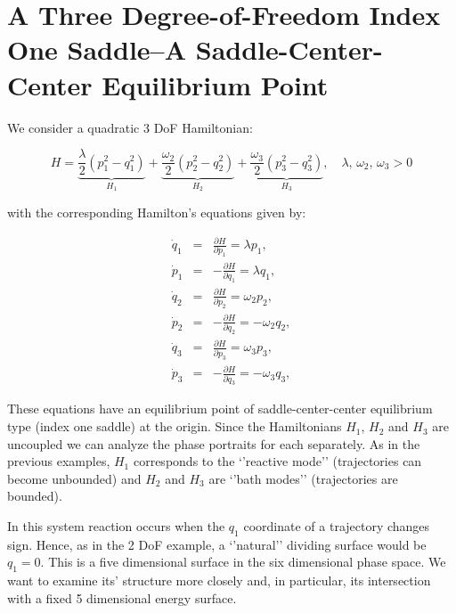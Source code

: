 \documentclass{article}
\begin{document}
\section*{A Three Degree-of-Freedom Index One Saddle--A Saddle-Center-Center Equilibrium Point}



We consider  a quadratic 3 DoF  Hamiltonian:




\begin{equation}
H = \underbrace{\frac{\lambda}{2} \left(p_1^2 - q_1^2 \right)}_{H_1} + \underbrace{\frac{\omega_2}{2} \left(p_2^2 - q_2^2 \right)}_{H_2} + \underbrace{\frac{\omega_3}{2} \left(p_3^2 - q_3^2 \right)}_{H_3}, \quad \lambda, \, \omega_2, \, \omega_3 >0
\label{ham3}
\end{equation}

\noindent
with the corresponding Hamilton's equations given by:


\begin{eqnarray}
\dot{q}_1 & = & \frac{\partial H}{\partial p_1}= \lambda p_1, \nonumber \\
\dot{p}_1 & = & -\frac{\partial H}{\partial q_1}= \lambda q_1, \nonumber \\
\dot{q}_2 & = & \frac{\partial H}{\partial p_2}= \omega_2 p_2, \nonumber \\
\dot{p}_2 & = & -\frac{\partial H}{\partial q_2}= -\omega_2 q_2, \nonumber \\
\dot{q}_3 & = & \frac{\partial H}{\partial p_3}= \omega_3 p_3, \nonumber \\
\dot{p}_3 & = & -\frac{\partial H}{\partial q_3}= -\omega_3 q_3, 
\label{hameq3}
\end{eqnarray}

\noindent
These equations have an equilibrium point of saddle-center-center equilibrium type (index one saddle) at the origin.
Since the Hamiltonians $H_1$, $H_2$ and $H_3$ are uncoupled we can analyze the phase portraits for each separately. 
As in the previous examples, $H_1$ corresponds to the `'reactive mode''  (trajectories can become unbounded) and $H_2$ and $H_3$   are `'bath modes'' (trajectories are bounded). 

In this system reaction occurs when  the $q_1$ coordinate of a trajectory changes sign. Hence, as in the 2 DoF example, a `'natural'' dividing surface would be $q_1 =0$. This is a five dimensional surface in the six dimensional phase space. We want to examine its' structure more closely and, in particular, its intersection with a fixed 5 dimensional energy surface.
\end{document}
